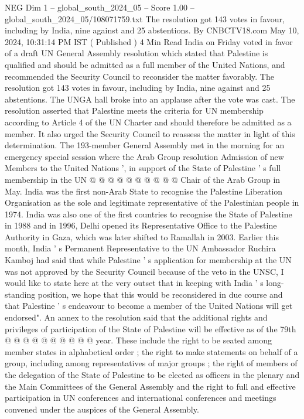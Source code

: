 \begin{textsample}{NEG Dim 1 – global\_south\_2024\_05 – Score 1.00 – global\_south\_2024\_05/108071759.txt}  \label{ex:f1_neg_372}
The resolution got 143 votes in favour, including by India, nine against and 25 abstentions.
By CNBCTV18.com May 10, 2024, 10:31:14 PM IST ( Published ) 4 Min Read India on Friday voted in favor of a draft UN General Assembly resolution which stated that Palestine is qualified and should be admitted as a full member of the United Nations, and recommended the Security Council to reconsider the matter favorably.
The resolution got 143 votes in favour, including by India, nine against and 25 abstentions.
The UNGA hall broke into an applause after the vote was cast.
The resolution asserted that Palestine meets the criteria for UN membership according to Article 4 of the UN Charter and should therefore be admitted as a member.
It also urged the Security Council to reassess the matter in light of this determination.
The 193-member General Assembly met in the morning for an emergency special session where the Arab Group resolution Admission of new Members to the United Nations ', in support of the State of Palestine ' s full membership in the UN @ @ @ @ @ @ @ @ @ @ Chair of the Arab Group in May.
India was the first non-Arab State to recognise the Palestine Liberation Organisation as the sole and legitimate representative of the Palestinian people in 1974.
India was also one of the first countries to recognise the State of Palestine in 1988 and in 1996, Delhi opened its Representative Office to the Palestine Authority in Gaza, which was later shifted to Ramallah in 2003.
Earlier this month, India ' s Permanent Representative to the UN Ambassador Ruchira Kamboj had said that while Palestine ' s application for membership at the UN was not approved by the Security Council because of the veto in the UNSC, I would like to state here at the very outset that in keeping with India ' s long-standing position, we hope that this would be reconsidered in due course and that Palestine ' s endeavour to become a member of the United Nations will get endorsed".
An annex to the resolution said that the additional rights and privileges of participation of the State of Palestine will be effective as of the 79th @ @ @ @ @ @ @ @ @ @ year.
These include the right to be seated among member states in alphabetical order ; the right to make statements on behalf of a group, including among representatives of major groups ; the right of members of the delegation of the State of Palestine to be elected as officers in the plenary and the Main Committees of the General Assembly and the right to full and effective participation in UN conferences and international conferences and meetings convened under the auspices of the General Assembly.

\end{textsample}
